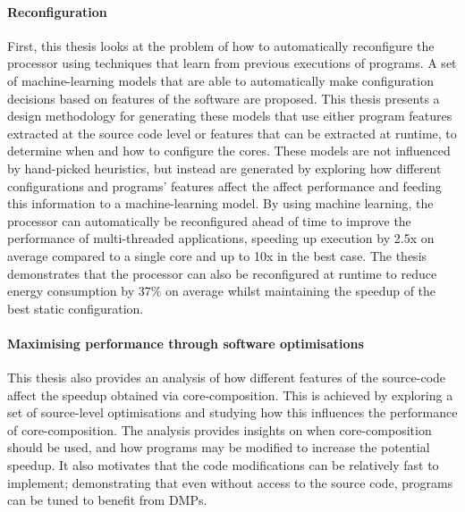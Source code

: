 \paragraph*{Reconfiguration}
First, this thesis looks at the problem of how to automatically reconfigure the processor using techniques that learn from previous executions of programs.
A set of machine-learning models that are able to automatically make configuration decisions based on features of the software are proposed.
This thesis presents a design methodology for generating these models that use either program features extracted at the source code level or features that can be extracted at runtime, to determine when and how to configure the cores.
These models are not influenced by hand-picked heuristics, but instead are generated by exploring how different configurations and programs' features affect the affect performance and feeding this information to a machine-learning model.
By using machine learning, the processor can automatically be reconfigured ahead of time to improve the performance of multi-threaded applications, speeding up execution by 2.5x on average compared to a single core and up to 10x in the best case.
The thesis demonstrates that the processor can also be reconfigured at runtime to reduce energy consumption by 37\% on average whilst maintaining the speedup of the best static configuration.

\paragraph*{Maximising performance through software optimisations}
This thesis also provides an analysis of how different features of the source-code affect the speedup obtained via core-composition.
This is achieved by exploring a set of source-level optimisations and studying how this influences the performance of core-composition.
The analysis provides insights on when core-composition should be used, and how programs may be modified to increase the potential speedup.
It also motivates that the code modifications can be relatively  fast to implement; demonstrating that even without access to the source code, programs can be tuned to benefit from DMPs.


